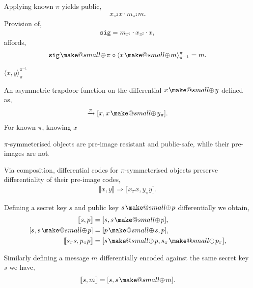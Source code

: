 \documentclass[twocolumn, aps, amsmath, amssymb, nofootinbib, superscriptaddress, longbibliography, doublefloatfix, table-of-contents, eqsecnum, rmp]{revtex4-2}
\makeatletter
\def\diff#1#2{\llbracket #1,#2\rrbracket}
\def\braid#1#2#3#4{\langle#1,#2\rangle_{#3}^{#4}}
\def\selfbraid#1#2#3{\langle#1\rangle_{#2}^{#3}}
\newcommand{\soplus}{{{\hspace{1pt}}{\mathbin{\mathpalette\make@small\oplus}}}{\hspace{1pt}}}
\newcommand{\make@small}[2]{%
  \vcenter{\hbox{%
    \scalebox{0.6}{$\m@th#1#2$}%
  }}%
}
\makeatother
\begin{document}
Applying known $\pi$ yields public,
\begin{align}
	x_{\pi^2}x \cdot m_{\pi^2} m.
\end{align}
Provision of,
\begin{align}
	\mathtt{sig} = m_{\pi^2} \cdot x_{\pi^2} \cdot x,
\end{align}
affords,
\begin{align}
	\mathtt{sig} \soplus \pi \circ \selfbraid{x\soplus m}{\pi^{-1}}{\pi} = m.
\end{align}

$\braid{x}{y}{\pi}{\pi^{-1}}$


An asymmetric trapdoor function on the differential $x\soplus y$ defined as,
\begin{align}
	[x,x\soplus y] \xrightarrow{\pi} [x, x \soplus y_\pi].
\end{align}
For known $\pi$, knowing $x$

$\pi$-symmeterised objects are pre-image resistant and public-safe, while their pre-images are not.

Via composition, differential codes for $\pi$-symmeterised objects preserve differentiality of their pre-image codes,
\begin{align}
	\diff{x}{y} \Rightarrow \diff{x_\pi x}{y_\pi y}.
\end{align}

Defining a secret key $s$ and public key $s\soplus p$ differentially we obtain,
\begin{align}
	\diff{s}{p} &= [s, s\soplus p],\nonumber\\
	[s, s\soplus p] &= [p\soplus s, p],\nonumber\\
	\diff{s_\pi s}{p_\pi p} &= [s\soplus p, s_\pi\soplus p_\pi],\nonumber\\
\end{align}

Similarly defining a message $m$ differentially encoded against the same secret key $s$ we have,
\begin{align}
	\diff{s}{m} = [s,s\soplus m].
\end{align}
\end{document}
